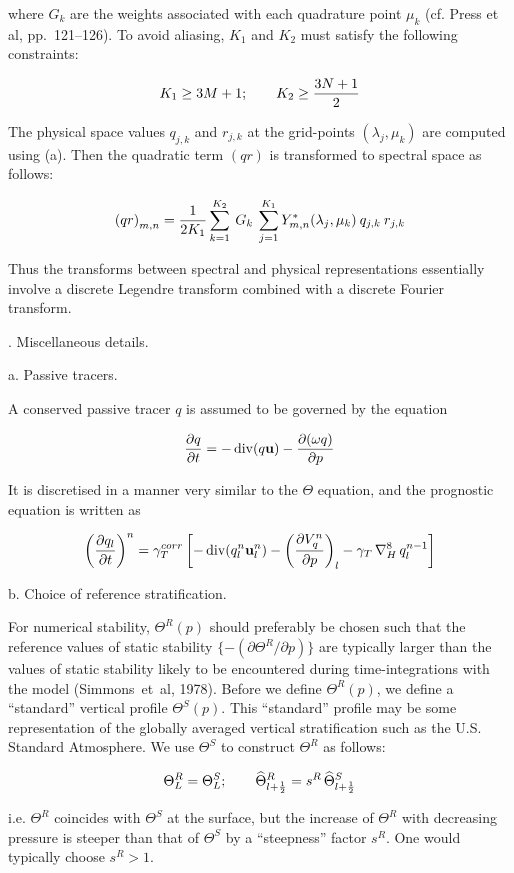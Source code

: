 where $G_k$ are the weights associated with each quadrature point $\mu_k$ (cf.
Press et al, pp.~121--126). To avoid aliasing, $K_1$ and $K_2$ must satisfy
the following constraints:
 
$$ K_1 \ge 3M + 1; \qquad K_2 \ge {3N + 1 \over 2}
$$
 
The physical space values $q_{j,k}$ and $r_{j,k}$ at the grid-points
$(\lambda_j,\mu_k)$ are computed using (\cureq a). Then the quadratic term
$(qr)$ is transformed to spectral space as follows:
 
$$ {(qr)}_{m,n} = {1 \over 2K_1} \sum_{k=1}^{K_2} \> G_k \>
       \sum_{j=1}^{K_1} \Ymn[m,n]^\ast(\lambda_j,\mu_k) \> q_{j,k} \> r_{j,k}
$$
 
Thus the transforms between spectral and physical representations essentially
involve a discrete Legendre transform combined with a discrete Fourier
transform.
 
 
. Miscellaneous details.
 
\Subsection a. Passive tracers.
 
A conserved passive tracer $q$ is assumed to be governed by the equation
 
$$ \pd[q,t] = - \div(q\uvec) -  \pd[(\omega q), p]
$$
 
It is discretised in a manner very similar to the $\Theta$ equation, and the
prognostic equation is written as
 
$$ \tt[q_l,n] = \gamma_T^{corr} \left[ - \div(q_l^n\uvec_l^n)
                  -  \vdiv{V_q^n}  - \gamma_T \deleight q_l^{n-1} \right]
$$
 
 
\Subsection b. Choice of reference stratification.
 
For numerical stability, $\Theta^R(p)$ should preferably be chosen such that
the reference values of static stability $\{-(\partial\Theta^R/\partial p)\}$
are typically larger than the values of static stability likely to be
encountered during time-integrations with the model (Simmons~et~al, 1978).
Before we define $\Theta^R(p)$, we define a ``standard'' vertical profile
$\Theta^S(p)$. This ``standard'' profile may be some representation of the
globally averaged vertical stratification such as the U.S. Standard
Atmosphere.  We use $\Theta^S$ to construct $\Theta^R$ as follows:
 
$$ \Theta^R_L = \Theta^S_L; \qquad
   {\widehat \Theta}^R_{l+{1 \over 2}} = s^R \, {\widehat \Theta}^S_{l+{1 \over 2}}
$$
 
i.e. $\Theta^R$ coincides with $\Theta^S$ at the surface, but the increase of
$\Theta^R$ with decreasing pressure is steeper than that of $\Theta^S$ by a
``steepness'' factor $s^R$. One would typically choose $s^R > 1$.
 
